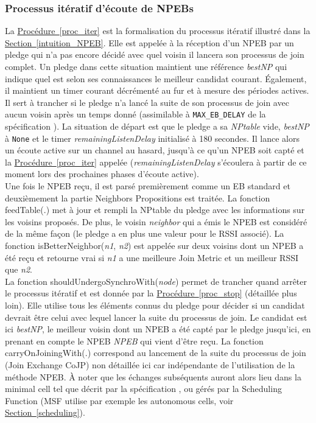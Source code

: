 \documentclass[]{report}
\newcommand{\wordlink}[2]{\hyperref[#2]{#1~\ref{#2}}}
\begin{document}
\subsubsection{Processus itératif d'écoute de NPEBs}

La \wordlink{Procédure}{proc_iter} est la formalisation du processus itératif illustré dans la \wordlink{Section}{intuition_NPEB}. Elle est appelée à la réception d'un NPEB par un pledge qui n'a pas encore décidé avec quel voisin il lancera son processus de join complet. Un pledge dans cette situation maintient une référence \textit{bestNP} qui indique quel est selon ses connaissances le meilleur candidat courant. Également, il maintient un timer courant décrémenté au fur et à mesure des périodes actives. Il sert à trancher si le pledge n'a lancé la suite de son processus de join avec aucun voisin après un temps donné (assimilable à \texttt{MAX\_EB\_DELAY} de la spécification \cite{rfc8180}). La situation de départ est que le pledge a sa \textit{NPtable} vide, \textit{bestNP} à \texttt{None} et le timer \textit{remainingListenDelay} initialisé à 180 secondes. Il lance alors un écoute active sur un channel au hasard, jusqu'à ce qu'un NPEB soit capté et la \wordlink{Procédure}{proc_iter} appelée (\textit{remainingListenDelay} s'écoulera à partir de ce moment lors des prochaines phases d'écoute active).\\

Une fois le NPEB reçu, il est parsé premièrement comme un EB standard et deuxièmement la partie Neighbors Propositions est traitée. La fonction feedTable(.) met à jour et rempli la NPtable du pledge avec les informations sur les voisins proposés. De plus, le voisin \textit{neighbor} qui a émis le NPEB est considéré de la même façon (le pledge a en plus une valeur pour le RSSI associé). La fonction isBetterNeighbor(\textit{n1}, \textit{n2}) est appelée sur deux voisins dont un NPEB a été reçu et retourne vrai si \textit{n1} a une meilleure Join Metric et un meilleur RSSI que \textit{n2}.\\

La fonction shouldUndergoSynchroWith(\textit{node}) permet de trancher quand arrêter le processus itératif et est donnée par la \wordlink{Procédure}{proc_stop} (détaillée plus loin). Elle utilise tous les éléments connus du pledge pour décider si un candidat devrait être celui avec lequel lancer la suite du processus de join. Le candidat est ici \textit{bestNP}, le meilleur voisin dont un NPEB a été capté par le pledge jusqu'ici, en prenant en compte le NPEB \textit{NPEB} qui vient d'être reçu. La fonction carryOnJoiningWith(.) correspond au lancement de la suite du processus de join (Join Exchange CoJP) non détaillée ici car indépendante de l'utilisation de la méthode NPEB. À noter que les échanges subséquents auront alors lieu dans la minimal cell tel que décrit par la spécification \cite{rfc8180}, ou gérés par la Scheduling Function (MSF utilise par exemple les autonomous cells, voir \wordlink{Section}{scheduling}).\\
\end{document}
